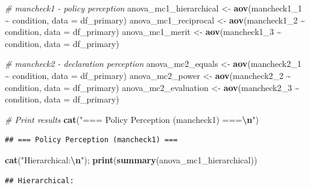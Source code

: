 \documentclass[
]{article}
\newenvironment{Shaded}{\begin{snugshade}}{\end{snugshade}}
\newcommand{\AttributeTok}[1]{\textcolor[rgb]{0.13,0.29,0.53}{#1}}
\newcommand{\CommentTok}[1]{\textcolor[rgb]{0.56,0.35,0.01}{\textit{#1}}}
\newcommand{\FunctionTok}[1]{\textcolor[rgb]{0.13,0.29,0.53}{\textbf{#1}}}
\newcommand{\NormalTok}[1]{#1}
\newcommand{\OtherTok}[1]{\textcolor[rgb]{0.56,0.35,0.01}{#1}}
\newcommand{\SpecialCharTok}[1]{\textcolor[rgb]{0.81,0.36,0.00}{\textbf{#1}}}
\newcommand{\StringTok}[1]{\textcolor[rgb]{0.31,0.60,0.02}{#1}}
\begin{document}
\begin{Shaded}
\begin{Highlighting}[]
\CommentTok{\# mancheck1 {-} policy perception}
\NormalTok{anova\_mc1\_hierarchical }\OtherTok{\textless{}{-}} \FunctionTok{aov}\NormalTok{(mancheck1\_1 }\SpecialCharTok{\textasciitilde{}}\NormalTok{ condition, }\AttributeTok{data =}\NormalTok{ df\_primary)}
\NormalTok{anova\_mc1\_reciprocal   }\OtherTok{\textless{}{-}} \FunctionTok{aov}\NormalTok{(mancheck1\_2 }\SpecialCharTok{\textasciitilde{}}\NormalTok{ condition, }\AttributeTok{data =}\NormalTok{ df\_primary)}
\NormalTok{anova\_mc1\_merit        }\OtherTok{\textless{}{-}} \FunctionTok{aov}\NormalTok{(mancheck1\_3 }\SpecialCharTok{\textasciitilde{}}\NormalTok{ condition, }\AttributeTok{data =}\NormalTok{ df\_primary)}

\CommentTok{\# mancheck2 {-} declaration perception}
\NormalTok{anova\_mc2\_equals       }\OtherTok{\textless{}{-}} \FunctionTok{aov}\NormalTok{(mancheck2\_1 }\SpecialCharTok{\textasciitilde{}}\NormalTok{ condition, }\AttributeTok{data =}\NormalTok{ df\_primary)}
\NormalTok{anova\_mc2\_power        }\OtherTok{\textless{}{-}} \FunctionTok{aov}\NormalTok{(mancheck2\_2 }\SpecialCharTok{\textasciitilde{}}\NormalTok{ condition, }\AttributeTok{data =}\NormalTok{ df\_primary)}
\NormalTok{anova\_mc2\_evaluation   }\OtherTok{\textless{}{-}} \FunctionTok{aov}\NormalTok{(mancheck2\_3 }\SpecialCharTok{\textasciitilde{}}\NormalTok{ condition, }\AttributeTok{data =}\NormalTok{ df\_primary)}

\CommentTok{\# Print results}
\FunctionTok{cat}\NormalTok{(}\StringTok{"=== Policy Perception (mancheck1) ===}\SpecialCharTok{\textbackslash{}n}\StringTok{"}\NormalTok{)}
\end{Highlighting}
\end{Shaded}

\begin{verbatim}
## === Policy Perception (mancheck1) ===
\end{verbatim}

\begin{Shaded}
\begin{Highlighting}[]
\FunctionTok{cat}\NormalTok{(}\StringTok{"Hierarchical:}\SpecialCharTok{\textbackslash{}n}\StringTok{"}\NormalTok{);  }\FunctionTok{print}\NormalTok{(}\FunctionTok{summary}\NormalTok{(anova\_mc1\_hierarchical))}
\end{Highlighting}
\end{Shaded}

\begin{verbatim}
## Hierarchical:
\end{verbatim}
\end{document}
